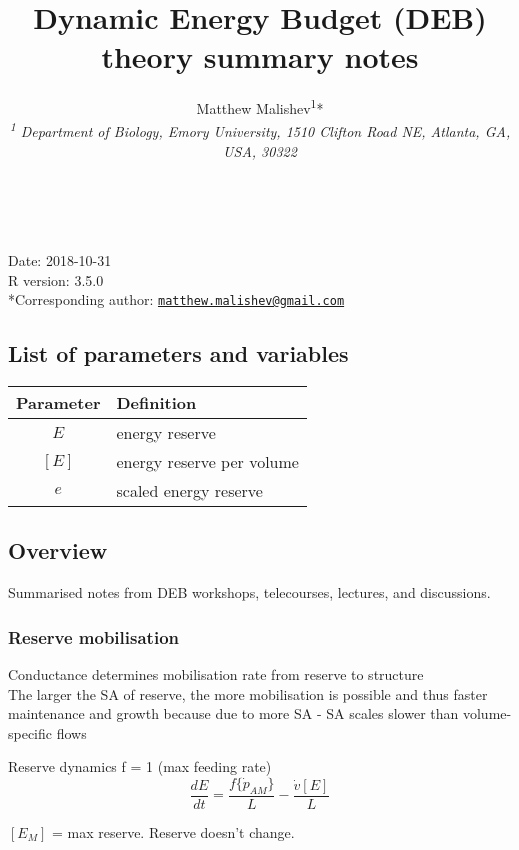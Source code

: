 \documentclass[10,portrait]{article}
\title{Dynamic Energy Budget (DEB) theory summary notes}
\author{Matthew
Malishev\textsuperscript{1}*\\[2\baselineskip]\emph{\textsuperscript{1}
Department of Biology, Emory University, 1510 Clifton Road NE, Atlanta,
GA, USA, 30322}}
\date{}
\begin{document}
\maketitle

{
\hypersetup{linkcolor=black}
\setcounter{tocdepth}{4}
\tableofcontents
}
~

Date: 2018-10-31\\
R version: 3.5.0\\
*Corresponding author:
\href{mailto:matthew.malishev@gmail.com}{\nolinkurl{matthew.malishev@gmail.com}}

\newpage  

\subsection{List of parameters and
variables}\label{list-of-parameters-and-variables}

\begin{longtable}[]{@{}cl@{}}
\toprule
Parameter & Definition\tabularnewline
\midrule
\endhead
\(E\) & energy reserve\tabularnewline
\([E]\) & energy reserve per volume\tabularnewline
\(e\) & scaled energy reserve\tabularnewline
\bottomrule
\end{longtable}

\newpage  

\subsection{Overview}\label{overview}

Summarised notes from DEB workshops, telecourses, lectures, and
discussions.

\subsubsection{Reserve mobilisation}\label{reserve-mobilisation}

Conductance determines mobilisation rate from reserve to structure\\
The larger the SA of reserve, the more mobilisation is possible and thus
faster maintenance and growth because due to more SA - SA scales slower
than volume-specific flows

Reserve dynamics f = 1 (max feeding rate)\\
\[
\frac
  {d E}
  {d t}  
  = \frac
  {f\{\dot{p}_{AM}\}}
  {L}  
  - \frac  
  {\dot{v}[E]}  
  {L}   
\]

\([E_{M}]\) = max reserve. Reserve doesn't change.
\end{document}
